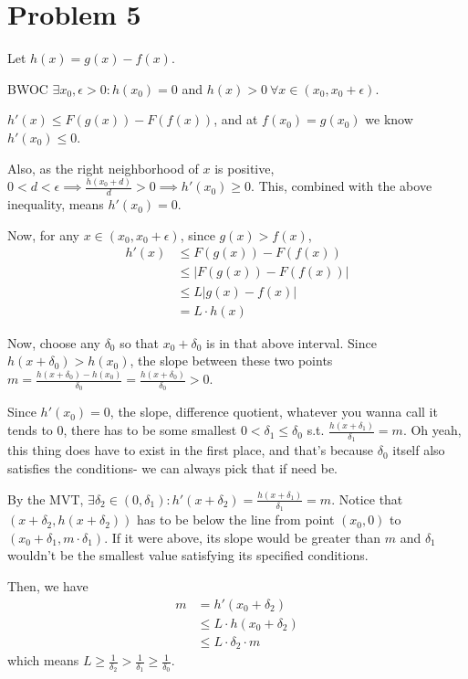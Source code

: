\documentclass[12pt]{article}
\begin{document}
\pagebreak

\section{Problem 5}

Let $h(x)=g(x)-f(x)$.

BWOC $\exists x_0, \epsilon > 0: h(x_0)=0$ and $h(x) > 0\ \forall x \in (x_0, x_0 + \epsilon)$.

$h'(x) \le F(g(x))-F(f(x))$, and at $f(x_0)=g(x_0)$ we know $h'(x_0) \le 0$.

Also, as the right neighborhood of $x$ is positive, $0 < d < \epsilon \implies \frac{h(x_0+d)}{d} > 0 \implies h'(x_0) \ge 0$.
This, combined with the above inequality, means $h'(x_0)=0$.

Now, for any $x \in (x_0, x_0 + \epsilon)$, since $g(x) > f(x)$,
\begin{align*}
  h'(x) & \le F(g(x))-F(f(x))   \\
        & \le |F(g(x))-F(f(x))| \\
        & \le L|g(x)-f(x)|      \\
        & = L \cdot h(x)
\end{align*}

Now, choose any $\delta_0$ so that $x_0 + \delta_0$ is in that above interval.
Since $h(x+\delta_0) > h(x_0)$,
the slope between these two points $m=\frac{h(x+\delta_0)-h(x_0)}{\delta_0}=\frac{h(x+\delta_0)}{\delta_0} > 0$.

Since $h'(x_0)=0$, the slope, difference quotient, whatever you wanna call it tends to $0$,
there has to be some smallest $0 < \delta_1 \le \delta_0$ s.t. $\frac{h(x+\delta_1)}{\delta_1}=m$.
Oh yeah, this thing does have to exist in the first place, and that's because $\delta_0$
itself also satisfies the conditions- we can always pick that if need be.

By the MVT, $\exists \delta_2 \in (0, \delta_1): h'(x+\delta_2)=\frac{h(x+\delta_1)}{\delta_1} = m$.
Notice that $(x + \delta_2, h(x + \delta_2))$ has to be below the line from point $(x_0, 0)$ to $(x_0+\delta_1, m \cdot \delta_1)$.
If it were above, its slope would be greater than $m$
and $\delta_1$ wouldn't be the smallest value satisfying its specified conditions.

Then, we have
\begin{align*}
  m & = h'(x_0+\delta_2)            \\
    & \le L \cdot h(x_0 + \delta_2) \\
    & \le L \cdot \delta_2 \cdot m
\end{align*}
which means $L \ge \frac{1}{\delta_2} > \frac{1}{\delta_1} \ge \frac{1}{\delta_0}$.
\end{document}
